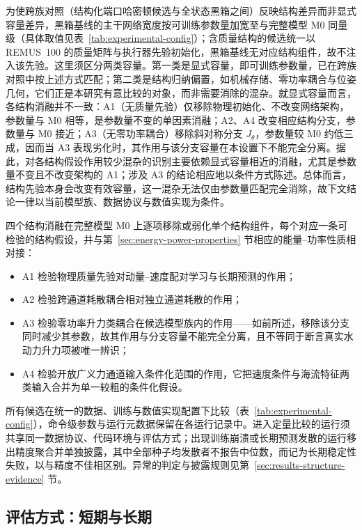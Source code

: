 为使跨族对照（结构化端口哈密顿候选与全状态黑箱之间）反映结构差异而非显式容量差异，黑箱基线的主干网络宽度按可训练参数量加宽至与完整模型 M0 同量级（具体取值见表~\ref{tab:experimental-config}）；含质量结构的候选统一以 REMUS~100 的质量矩阵与执行器先验初始化，黑箱基线无对应结构组件，故不注入该先验。这里须区分两类容量。第一类是显式容量，即可训练参数量，已在跨族对照中按上述方式匹配；第二类是结构归纳偏置，如机械存储、零功率耦合与位姿几何，它们正是本研究有意比较的对象，而非需要消除的混杂。就显式容量而言，各结构消融并不一致：A1（无质量先验）仅移除物理初始化、不改变网络架构，参数量与 M0 相等，是参数量不变的单因素消融；A2、A4 改变相应结构分支，参数量与 M0 接近；A3（无零功率耦合）移除斜对称分支 \(J_\theta\)，参数量较 M0 约低三成，因而当 A3 表现劣化时，其作用与该分支容量在本设置下不能完全分离。据此，对各结构假设作用较少混杂的识别主要依赖显式容量相近的消融，尤其是参数量不变且不改变架构的 A1；涉及 A3 的结论相应地以条件方式陈述。总体而言，结构先验本身会改变有效容量，这一混杂无法仅由参数量匹配完全消除，故下文结论一律以当前模型族、数据协议与数值实现为条件。

四个结构消融在完整模型 M0 上逐项移除或弱化单个结构组件，每个对应一条可检验的结构假设，并与第~\ref{sec:energy-power-properties} 节相应的能量--功率性质相对接：
\begin{itemize}
  \item A1 检验物理质量先验对动量--速度配对学习与长期预测的作用；
  \item A2 检验跨通道耗散耦合相对独立通道耗散的作用；
  \item A3 检验零功率升力类耦合在候选模型族内的作用——如前所述，移除该分支同时减少其参数，故其作用与分支容量不能完全分离，且不等同于断言真实水动力升力项被唯一辨识；
  \item A4 检验开放广义力通道输入条件化范围的作用，它把速度条件与海流特征两类输入合并为单一较粗的条件化假设。
\end{itemize}

所有候选在统一的数据、训练与数值实现配置下比较（表~\ref{tab:experimental-config}），命令级参数与运行元数据保留在各运行记录中。进入定量比较的运行须共享同一数据协议、代码环境与评估方式；出现训练崩溃或长期预测发散的运行移出精度聚合并单独披露，其中全部种子均发散者不报告中位数，而记为长期稳定性失败，以与精度不佳相区别。异常的判定与披露规则见第~\ref{sec:results-structure-evidence} 节。

\subsection{评估方式：短期与长期}
\label{subsec:rollout-eval}

